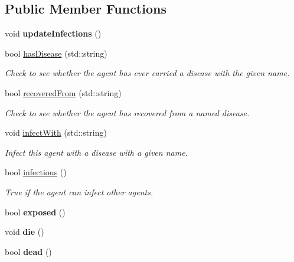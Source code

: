 \subsection*{Public Member Functions}
\begin{DoxyCompactItemize}
\item 
\mbox{\label{classagent_a7fef7c5b65fb384d74d7606168058212}} 
void {\bfseries update\+Infections} ()
\item 
bool \mbox{\hyperlink{classagent_aab67fe9df4777af3690138fa97d0a3a1}{has\+Disease}} (std\+::string)
\begin{DoxyCompactList}\small\item\em Check to see whether the agent has ever carried a disease with the given name. \end{DoxyCompactList}\item 
bool \mbox{\hyperlink{classagent_a0eee49d52e6c47d7b425bc72cf5caf67}{recovered\+From}} (std\+::string)
\begin{DoxyCompactList}\small\item\em Check to see whether the agent has recovered from a named disease. \end{DoxyCompactList}\item 
void \mbox{\hyperlink{classagent_ac55fabf889e49a48c055c9c495062d5e}{infect\+With}} (std\+::string)
\begin{DoxyCompactList}\small\item\em Infect this agent with a disease with a given name. \end{DoxyCompactList}\item 
bool \mbox{\hyperlink{classagent_ae186a297218e835ac064bf7a329d5b42}{infectious}} ()
\begin{DoxyCompactList}\small\item\em True if the agent can infect other agents. \end{DoxyCompactList}\item 
\mbox{\label{classagent_a2a92e38a01bd4c7e03747a3a35d741a0}} 
bool {\bfseries exposed} ()
\item 
\mbox{\label{classagent_a3c31fe2f6f752a35261041b5bef3c532}} 
void {\bfseries die} ()
\item 
\mbox{\label{classagent_a9b9b71b861f9074017a73128c098ef7d}} 
bool {\bfseries dead} ()
\item 

\end{DoxyCompactItemize}
